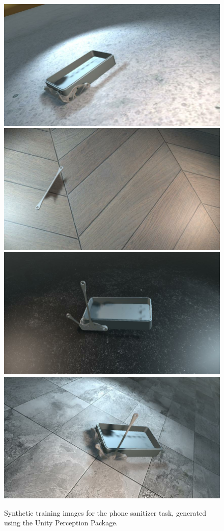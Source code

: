 \begin{figure}
  \includegraphics[width=0.5\columnwidth]{figures/sanitizer/unity1.png}
  \includegraphics[width=0.5\columnwidth]{figures/sanitizer/unity2.png}
  \includegraphics[width=0.5\columnwidth]{figures/sanitizer/unity3.png}
  \includegraphics[width=0.5\columnwidth]{figures/sanitizer/unity4.png}
  \caption{
    Synthetic training images for the phone sanitizer task, generated using the
    Unity Perception Package.
  }\label{fig:sanitizer_unity}
\end{figure}

